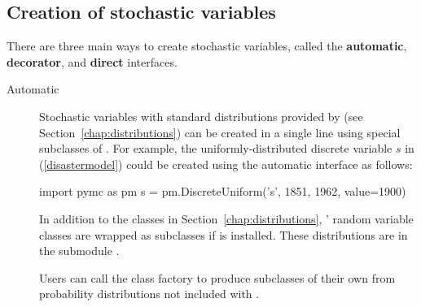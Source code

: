 \documentclass[]{jss}
\begin{document}
\subsection{Creation of stochastic variables}
There are three main ways to create stochastic variables, called the \textbf{automatic}, \textbf{decorator}, and \textbf{direct} interfaces.

\begin{description}
    \item[Automatic] Stochastic variables with standard distributions provided by  (see Section~\ref{chap:distributions}) can be created in a single line using special subclasses of . For example, the uniformly-distributed discrete variable $s$ in (\ref{disastermodel}) could be created using the automatic interface as follows:
\begin{CodeInput}
import pymc as pm
s = pm.DiscreteUniform('s', 1851, 1962, value=1900)
\end{CodeInput}

    In addition to the classes in Section~\ref{chap:distributions}, ' random variable classes are wrapped as  subclasses if  is installed. These distributions are in the submodule .

    Users can call the class factory  to produce  subclasses of their own from probability distributions not included with .%



\end{description}
\end{document}
